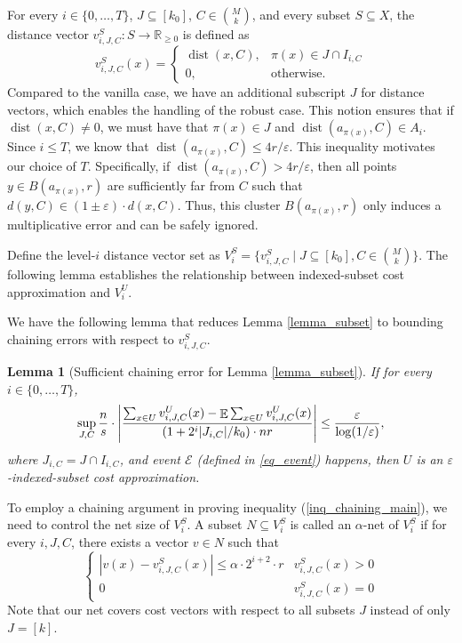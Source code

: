 \documentclass[11pt,letterpaper]{article}
\newtheorem{lemma}[theorem]{Lemma}
\theoremstyle{definition}
\newcommand{\eps}{\varepsilon}
\DeclareMathOperator*{\E}{\ensuremath{\mathbb{E}}}
\DeclareMathOperator{\dist}{dist}
\DeclarePairedDelimiter{\abs}{\lvert}{\rvert}
\begin{document}
For every $i\in \{0,\dots,T\}$, $J\subseteq [k_0]$, $C\in \binom{M}{k}$, and every subset $S\subseteq X$, the distance vector $v_{i,J,C}^S:S\rightarrow \mathbb{R}_{\geq 0}$ is defined as
\begin{equation}
\label{eq:vS}
v^S_{i,J,C}(x)=
\begin{cases}
    \dist(x,C), & \pi(x)\in J\cap I_{i,C} \\
    0, & \text{otherwise}.
\end{cases}
\end{equation}
%
Compared to the vanilla case, we have an additional subscript $J$ for distance vectors, which enables the handling of the robust case. 
%
This notion ensures that if $\dist(x,C) \neq 0$, we must have that $\pi(x)\in J$ and $\dist(a_{\pi(x)}, C)\in A_i$.
%
Since $i\leq T$, we know that $\dist(a_{\pi(x)}, C) \leq 4r/\eps$.
%
This inequality motivates our choice of \( T \). Specifically, if \( \dist(a_{\pi(x)}, C) > 4r/\eps \), then all points \( y \in B(a_{\pi(x)}, r) \) are sufficiently far from \( C \) such that $d(y, C) \in (1\pm \eps)\cdot d(x,C)$.
%
Thus, this cluster $B(a_{\pi(x)}, r)$ only induces a multiplicative error and can be safely ignored.
%

Define the level-$i$ distance vector set as $V^S_{i}=\{v^S_{i,J,C}\mid J\subseteq [k_0],C\in \binom{M}{k}\}$. The following lemma establishes the relationship between indexed-subset cost approximation and $V_i^U$.

We have the following lemma that reduces Lemma \ref{lemma_subset} to bounding chaining errors with respect to $v^S_{i,J,C}$.
%

\begin{lemma}[Sufficient chaining error for Lemma \ref{lemma_subset}]
\label{lemma_relate_main} 
If for every $i\in \{0,\dots,T\}$, 
\begin{equation} \label{inq_chaining_main}
\sup_{J,C} \frac{n}{s}\cdot \abs*{ \frac{\sum_{x\in U} v^U_{i,J,C}(x)-\E \sum_{x\in U} v^U_{i,J,C}(x)}{(1+2^i|J_{i,C}|/k_0)\cdot nr} }
\leq \frac{\eps}{\log(1/\eps)},
\end{equation}
where $J_{i,C}=J\cap I_{i,C}$,
and event $\mathcal{E}$ (defined in \eqref{eq_event}) happens, then $U$ is an $\eps$-indexed-subset cost approximation. 
%
\end{lemma}


To employ a chaining argument in proving inequality (\ref{inq_chaining_main}), we need to control the net size of $V_i^S$.
%
A subset $N\subseteq V^S_i$ is called an $\alpha$-net of $V^S_i$ if for every $i,J,C$, there exists a vector $v\in N$ such that
\[
\begin{cases}
|v(x)-v^S_{i,J,C}(x)|\leq \alpha\cdot 2^{i+2}\cdot r & v^S_{i,J,C}(x)>0\\
0 & v^S_{i,J,C}(x)=0
\end{cases}
\]
%
Note that our net covers cost vectors with respect to all subsets $J$ instead of only $J = [k]$.
\end{document}
